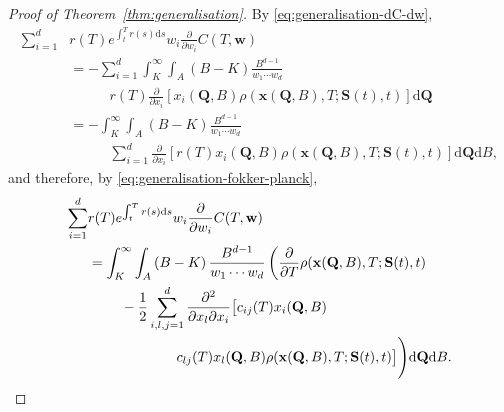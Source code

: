 \documentclass[english]{article}
\numberwithin{equation}{section}
\numberwithin{figure}{section}
\theoremstyle{bolddescit}
\theoremstyle{definition}
\theoremstyle{definition}
\theoremstyle{plain}
\theoremstyle{plain}
\theoremstyle{bolddesc}
\theoremstyle{plain}
\theoremstyle{remark}
\begin{document}
\begin{proof}[Proof of Theorem~\ref{thm:generalisation}]
  By \eqref{eq:generalisation-dC-dw},
  \begin{align*}
    \sum_{i=1}^{d} &r(T) e^{\int_t^T r(s) \mathrm{d}s} w_i \frac{\partial}{\partial w_i} C(T,\mathbf{w})\\
    &= - \sum_{i=1}^{d} \int_K^\infty \int_A \left(B - K\right) \frac{B^{d-1}}{w_1 \cdots w_d}\\
        &\ \ \ \ \ \ \ \ \ \ \ \ \  r(T)\frac{\partial}{\partial x_i}\left[x_i(\mathbf{Q},B) \rho(\mathbf{x}(\mathbf{Q},B),T;\mathbf{S}(t),t) \right] \mathrm{d}\mathbf{Q} \\
    &= - \int_K^\infty \int_A \left(B - K\right) \frac{B^{d-1}}{w_1 \cdots w_d}\\
        &\ \ \ \ \ \ \ \ \ \ \ \ \ \sum_{i=1}^{d} \frac{\partial}{\partial x_i}\left[r(T)x_i(\mathbf{Q},B) \rho(\mathbf{x}(\mathbf{Q},B),T;\mathbf{S}(t),t) \right] \mathrm{d}\mathbf{Q} \mathrm{d}B,
  \end{align*}
  and therefore, by \eqref{eq:generalisation-fokker-planck},
  \begin{align}
    \sum_{i=1}^{d} &r(T) e^{\int_t^T r(s) \mathrm{d}s} w_i \frac{\partial}{\partial w_i} C(T,\mathbf{w})\notag\\
    &= \int_K^\infty \int_A \left(B - K\right) \frac{B^{d-1}}{w_1 \cdots w_d}
      \left( \frac{\partial}{\partial T}\rho(\mathbf{x}(\mathbf{Q},B),T;\mathbf{S}(t),t)\right.\notag\\
      &\ \ \ \ \ \ \ - \frac{1}{2} \sum_{i,l,j=1}^{d} \frac{\partial^2}{\partial x_l \partial x_i}\big[c_{ij}(T) x_i(\mathbf{Q},B) \notag\\
      &\ \ \ \ \ \ \ \ \ \ \ \ \ \ \ \ \ \ \ c_{lj}(T) x_l(\mathbf{Q},B) \rho(\mathbf{x}(\mathbf{Q},B),T;\mathbf{S}(t),t)\big] \Bigg) \mathrm{d}\mathbf{Q} \mathrm{d}B. \label{eq:generalisation-one-deriv}
  \end{align}


\end{proof}
\end{document}
